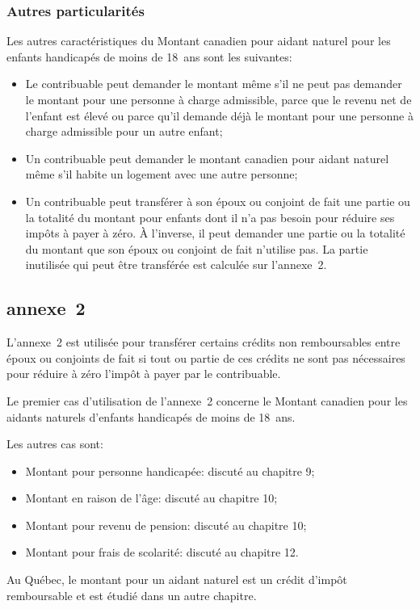 \subsubsection{Autres particularités}
Les autres caractéristiques du Montant canadien pour aidant naturel pour les enfants handicapés de moins de 18~ans sont les suivantes:
\begin{itemize}
	\item Le contribuable peut demander le montant même s'il ne peut pas demander le montant pour une personne à charge admissible, parce que le revenu net de l'enfant est élevé ou parce qu'il demande déjà le montant pour une personne à charge admissible pour un autre enfant;
	\item Un contribuable peut demander le montant canadien pour aidant naturel même s'il habite un logement avec une autre personne;
	\item Un contribuable peut transférer à son époux ou conjoint de fait une partie ou la totalité du montant pour enfants dont il n'a pas besoin pour réduire ses impôts à payer à zéro. À l'inverse, il peut demander une partie ou la totalité du montant que son époux ou conjoint de fait n'utilise pas. La partie inutilisée qui peut être transférée est calculée sur l'annexe~2.
\end{itemize}


\subsection{annexe~2}
L'annexe~2 est utilisée pour transférer certains crédits non remboursables entre époux ou conjoints de fait si tout ou partie de ces crédits ne sont pas nécessaires pour réduire à zéro l'impôt à payer par le contribuable.

Le premier cas d'utilisation de l'annexe~2 concerne le Montant canadien pour les aidants naturels d'enfants handicapés de moins de 18~ans.

Les autres cas sont: 
\begin{itemize}
	\item Montant pour personne handicapée: discuté au chapitre 9;
	\item Montant en raison de l'âge: discuté au chapitre 10;
	\item Montant pour revenu de pension: discuté au chapitre 10;
	\item Montant pour frais de scolarité: discuté au chapitre 12.
\end{itemize}

\begin{note}
	Au Québec, le montant pour un aidant naturel est un crédit d'impôt remboursable et est étudié dans un autre chapitre.
\end{note}

